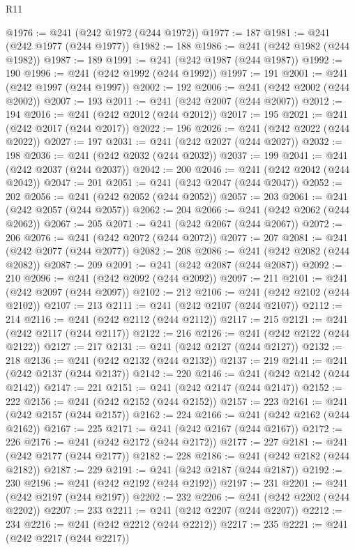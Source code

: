 \begin{lexlean}{R11}
\begin{coremodule}
@1976 := @241 (@242 @1972 (@244 @1972))
@1977 := 187
@1981 := @241 (@242 @1977 (@244 @1977))
@1982 := 188
@1986 := @241 (@242 @1982 (@244 @1982))
@1987 := 189
@1991 := @241 (@242 @1987 (@244 @1987))
@1992 := 190
@1996 := @241 (@242 @1992 (@244 @1992))
@1997 := 191
@2001 := @241 (@242 @1997 (@244 @1997))
@2002 := 192
@2006 := @241 (@242 @2002 (@244 @2002))
@2007 := 193
@2011 := @241 (@242 @2007 (@244 @2007))
@2012 := 194
@2016 := @241 (@242 @2012 (@244 @2012))
@2017 := 195
@2021 := @241 (@242 @2017 (@244 @2017))
@2022 := 196
@2026 := @241 (@242 @2022 (@244 @2022))
@2027 := 197
@2031 := @241 (@242 @2027 (@244 @2027))
@2032 := 198
@2036 := @241 (@242 @2032 (@244 @2032))
@2037 := 199
@2041 := @241 (@242 @2037 (@244 @2037))
@2042 := 200
@2046 := @241 (@242 @2042 (@244 @2042))
@2047 := 201
@2051 := @241 (@242 @2047 (@244 @2047))
@2052 := 202
@2056 := @241 (@242 @2052 (@244 @2052))
@2057 := 203
@2061 := @241 (@242 @2057 (@244 @2057))
@2062 := 204
@2066 := @241 (@242 @2062 (@244 @2062))
@2067 := 205
@2071 := @241 (@242 @2067 (@244 @2067))
@2072 := 206
@2076 := @241 (@242 @2072 (@244 @2072))
@2077 := 207
@2081 := @241 (@242 @2077 (@244 @2077))
@2082 := 208
@2086 := @241 (@242 @2082 (@244 @2082))
@2087 := 209
@2091 := @241 (@242 @2087 (@244 @2087))
@2092 := 210
@2096 := @241 (@242 @2092 (@244 @2092))
@2097 := 211
@2101 := @241 (@242 @2097 (@244 @2097))
@2102 := 212
@2106 := @241 (@242 @2102 (@244 @2102))
@2107 := 213
@2111 := @241 (@242 @2107 (@244 @2107))
@2112 := 214
@2116 := @241 (@242 @2112 (@244 @2112))
@2117 := 215
@2121 := @241 (@242 @2117 (@244 @2117))
@2122 := 216
@2126 := @241 (@242 @2122 (@244 @2122))
@2127 := 217
@2131 := @241 (@242 @2127 (@244 @2127))
@2132 := 218
@2136 := @241 (@242 @2132 (@244 @2132))
@2137 := 219
@2141 := @241 (@242 @2137 (@244 @2137))
@2142 := 220
@2146 := @241 (@242 @2142 (@244 @2142))
@2147 := 221
@2151 := @241 (@242 @2147 (@244 @2147))
@2152 := 222
@2156 := @241 (@242 @2152 (@244 @2152))
@2157 := 223
@2161 := @241 (@242 @2157 (@244 @2157))
@2162 := 224
@2166 := @241 (@242 @2162 (@244 @2162))
@2167 := 225
@2171 := @241 (@242 @2167 (@244 @2167))
@2172 := 226
@2176 := @241 (@242 @2172 (@244 @2172))
@2177 := 227
@2181 := @241 (@242 @2177 (@244 @2177))
@2182 := 228
@2186 := @241 (@242 @2182 (@244 @2182))
@2187 := 229
@2191 := @241 (@242 @2187 (@244 @2187))
@2192 := 230
@2196 := @241 (@242 @2192 (@244 @2192))
@2197 := 231
@2201 := @241 (@242 @2197 (@244 @2197))
@2202 := 232
@2206 := @241 (@242 @2202 (@244 @2202))
@2207 := 233
@2211 := @241 (@242 @2207 (@244 @2207))
@2212 := 234
@2216 := @241 (@242 @2212 (@244 @2212))
@2217 := 235
@2221 := @241 (@242 @2217 (@244 @2217))

\end{coremodule}
\end{lexlean}
